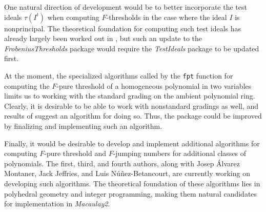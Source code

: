 \documentclass{amsart}
\begin{document}
One natural direction of development would be to better incorporate the test ideals $\tau(I^t)$ when computing $F$-thresholds in the case where the ideal $I$ is nonprincipal.
The theoretical foundation for computing such test ideals has already largely been worked out in \cite{SchwedeTuckerTestIdealsOfNonPrincipal}, but such an update to the \emph{FrobeniusThresholds} package would require the  \emph{TestIdeals} package to be updated first.

At the moment, the specialized algorithms called by the \texttt{fpt} function for computing the $F$-pure threshold of a homogeneous polynomial in two variables limits us to working with the standard grading on the ambient polynomial ring.  Clearly, it is desirable to be able to work with nonstandard gradings as well, and results of \cite{HernandezTeixeiraFThresholdFunctions} suggest an algorithm for doing so.  Thus, the package could be improved by finalizing and implementing such an algorithm.

Finally, it would be desirable to develop and implement additional algorithms for computing $F$-pure threshold and $F$-jumping numbers for additional classes of polynomials.  The first, third, and fourth authors, along with Josep \'Alvarez Montaner, Jack Jeffries, and Luis N\'u\~nez-Betancourt,  are currently working on developing such algorithms.  The theoretical foundation of these algorithms lies in polyhedral geometry and integer programming, making them natural candidates for  implementation in \emph{Macaulay2}.  




\end{document}
